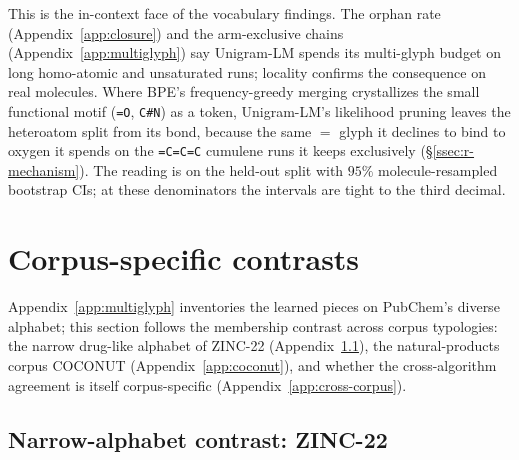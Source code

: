 \documentclass{article}
\begin{document}
This is the in-context face of the vocabulary findings. The orphan rate
(Appendix~\ref{app:closure}) and the arm-exclusive chains (Appendix~\ref{app:multiglyph})
say Unigram-LM spends its multi-glyph budget on long homo-atomic and unsaturated
runs; locality confirms the consequence on real molecules. Where BPE's
frequency-greedy merging crystallizes the small functional motif (\texttt{=O},
\texttt{C\#N}) as a token, Unigram-LM's likelihood pruning leaves the heteroatom
split from its bond, because the same $=$ glyph it declines to bind to oxygen it
spends on the \texttt{=C=C=C} cumulene runs it keeps exclusively
(\S\ref{ssec:r-mechanism}). The reading is on the held-out split with $95\%$
molecule-resampled bootstrap CIs; at these denominators the intervals are tight
to the third decimal.

\section{Corpus-specific contrasts}\label{app:contrasts}

Appendix~\ref{app:multiglyph} inventories the learned pieces on PubChem's diverse
alphabet; this section follows the membership contrast across corpus typologies:
the narrow
drug-like alphabet of ZINC-22 (Appendix~\ref{app:narrow}), the natural-products
corpus COCONUT (Appendix~\ref{app:coconut}), and whether the cross-algorithm
agreement is itself corpus-specific (Appendix~\ref{app:cross-corpus}).

\subsection{Narrow-alphabet contrast: ZINC-22}\label{app:narrow}


\end{document}
